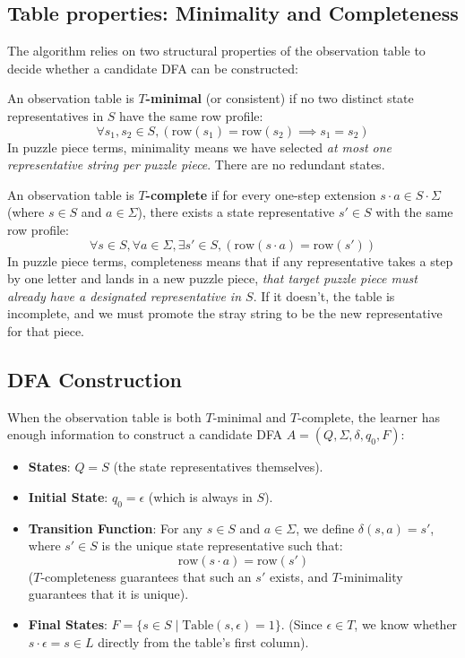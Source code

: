 \subsection{Table properties: Minimality and Completeness}

The algorithm relies on two structural properties of the observation table to decide whether a candidate DFA can be constructed:

\begin{definition}[$T$-minimality]
\label{def:t-minimality}
An observation table is \textbf{$T$-minimal} (or consistent) if no two distinct state representatives in $S$ have the same row profile:
\[
  \forall s_1, s_2 \in S, (\text{row}(s_1) = \text{row}(s_2) \implies s_1 = s_2)
\]
In puzzle piece terms, minimality means we have selected \emph{at most one representative string per puzzle piece}. There are no redundant states.
\end{definition}

\begin{definition}[$T$-completeness]
\label{def:t-completeness}
An observation table is \textbf{$T$-complete} if for every one-step extension $s \cdot a \in S \cdot \Sigma$ (where $s \in S$ and $a \in \Sigma$), there exists a state representative $s' \in S$ with the same row profile:
\[
  \forall s \in S, \forall a \in \Sigma, \exists s' \in S, (\text{row}(s \cdot a) = \text{row}(s'))
\]
In puzzle piece terms, completeness means that if any representative takes a step by one letter and lands in a new puzzle piece, \emph{that target puzzle piece must already have a designated representative in $S$}. If it doesn't, the table is incomplete, and we must promote the stray string to be the new representative for that piece.
\end{definition}

\subsection{DFA Construction}

When the observation table is both $T$-minimal and $T$-complete, the learner has enough information to construct a candidate DFA $A = (Q, \Sigma, \delta, q_0, F)$:
\begin{itemize}
  \item \textbf{States}: $Q = S$ (the state representatives themselves).
  \item \textbf{Initial State}: $q_0 = \epsilon$ (which is always in $S$).
  \item \textbf{Transition Function}: For any $s \in S$ and $a \in \Sigma$, we define $\delta(s, a) = s'$, where $s' \in S$ is the unique state representative such that:
  \[
    \text{row}(s \cdot a) = \text{row}(s')
  \]
  ($T$-completeness guarantees that such an $s'$ exists, and $T$-minimality guarantees that it is unique).
  \item \textbf{Final States}: $F = \{s \in S \mid \text{Table}(s, \epsilon) = 1\}$. (Since $\epsilon \in T$, we know whether $s \cdot \epsilon = s \in L$ directly from the table's first column).
\end{itemize}

